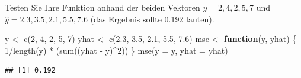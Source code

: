 \documentclass[12pt,a4paper]{article}
\newenvironment{Shaded}{\begin{snugshade}}{\end{snugshade}}
\newcommand{\AttributeTok}[1]{\textcolor[rgb]{0.77,0.63,0.00}{#1}}
\newcommand{\ControlFlowTok}[1]{\textcolor[rgb]{0.13,0.29,0.53}{\textbf{#1}}}
\newcommand{\DecValTok}[1]{\textcolor[rgb]{0.00,0.00,0.81}{#1}}
\newcommand{\FloatTok}[1]{\textcolor[rgb]{0.00,0.00,0.81}{#1}}
\newcommand{\FunctionTok}[1]{\textcolor[rgb]{0.00,0.00,0.00}{#1}}
\newcommand{\NormalTok}[1]{#1}
\newcommand{\OtherTok}[1]{\textcolor[rgb]{0.56,0.35,0.01}{#1}}
\newcommand{\SpecialCharTok}[1]{\textcolor[rgb]{0.00,0.00,0.00}{#1}}
\begin{document}
Testen Sie Ihre Funktion anhand der beiden Vektoren
\(y = {2, 4, 2, 5, 7}\) und \(\hat{y}= {2.3, 3.5, 2.1, 5.5, 7.6}\) (das
Ergebnis sollte 0.192 lauten).

\begin{Shaded}
\begin{Highlighting}[]
\NormalTok{    y    }\OtherTok{\textless{}{-}} \FunctionTok{c}\NormalTok{(}\DecValTok{2}\NormalTok{, }\DecValTok{4}\NormalTok{, }\DecValTok{2}\NormalTok{, }\DecValTok{5}\NormalTok{, }\DecValTok{7}\NormalTok{)}
\NormalTok{    yhat }\OtherTok{\textless{}{-}} \FunctionTok{c}\NormalTok{(}\FloatTok{2.3}\NormalTok{, }\FloatTok{3.5}\NormalTok{, }\FloatTok{2.1}\NormalTok{, }\FloatTok{5.5}\NormalTok{, }\FloatTok{7.6}\NormalTok{)}
\NormalTok{    mse }\OtherTok{\textless{}{-}} \ControlFlowTok{function}\NormalTok{(y, yhat) \{}
      \DecValTok{1}\SpecialCharTok{/}\FunctionTok{length}\NormalTok{(y) }\SpecialCharTok{*}\NormalTok{ (}\FunctionTok{sum}\NormalTok{((yhat }\SpecialCharTok{{-}}\NormalTok{ y)}\SpecialCharTok{\^{}}\DecValTok{2}\NormalTok{))}
\NormalTok{    \}}
    \FunctionTok{mse}\NormalTok{(}\AttributeTok{y =}\NormalTok{ y, }\AttributeTok{yhat =}\NormalTok{ yhat)}
\end{Highlighting}
\end{Shaded}

\begin{verbatim}
## [1] 0.192
\end{verbatim}
\end{document}
